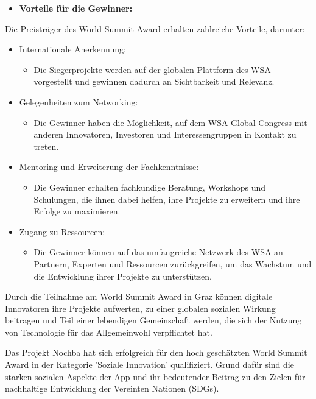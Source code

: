 \begin{itemize}
    \item \textbf{Vorteile für die Gewinner:}
\end{itemize}

Die Preisträger des World Summit Award erhalten zahlreiche Vorteile, darunter:

\begin{itemize}
    \item {Internationale Anerkennung:}
          \begin{itemize}
              \item {Die Siegerprojekte werden auf der globalen Plattform des WSA vorgestellt und gewinnen dadurch an Sichtbarkeit und Relevanz.}
          \end{itemize}
    \item {Gelegenheiten zum Networking:}
          \begin{itemize}
              \item {Die Gewinner haben die Möglichkeit, auf dem WSA Global Congress mit anderen Innovatoren, Investoren und Interessengruppen in Kontakt zu treten.}
          \end{itemize}
    \item {Mentoring und Erweiterung der Fachkenntnisse:}
          \begin{itemize}
              \item {Die Gewinner erhalten fachkundige Beratung, Workshops und Schulungen, die ihnen dabei helfen, ihre Projekte zu erweitern und ihre Erfolge zu maximieren.}
          \end{itemize}
    \item {Zugang zu Ressourcen:}
          \begin{itemize}
              \item {Die Gewinner können auf das umfangreiche Netzwerk des WSA an Partnern, Experten und Ressourcen zurückgreifen, um das Wachstum und die Entwicklung ihrer Projekte zu unterstützen.}
          \end{itemize}
\end{itemize}

Durch die Teilnahme am World Summit Award in Graz können digitale Innovatoren ihre Projekte aufwerten, zu einer globalen sozialen Wirkung beitragen und Teil einer lebendigen Gemeinschaft werden, die sich der Nutzung von Technologie für das Allgemeinwohl verpflichtet hat.

Das Projekt Nochba hat sich erfolgreich für den hoch geschätzten World Summit Award in der Kategorie 'Soziale Innovation' qualifiziert. Grund dafür sind die starken sozialen Aspekte der App und ihr bedeutender Beitrag zu den Zielen für nachhaltige Entwicklung der Vereinten Nationen (SDGs).

